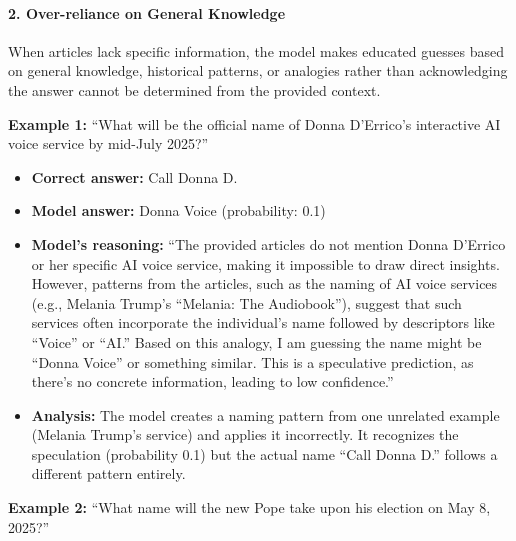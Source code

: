 \paragraph{2. Over-reliance on General Knowledge}

When articles lack specific information, the model makes educated guesses based on general knowledge, historical patterns, or analogies rather than acknowledging the answer cannot be determined from the provided context.

\textbf{Example 1:} ``What will be the official name of Donna D'Errico's interactive AI voice service by mid-July 2025?''

\begin{itemize}
\item \textbf{Correct answer:} Call Donna D.
\item \textbf{Model answer:} Donna Voice (probability: 0.1)
\item \textbf{Model's reasoning:} ``The provided articles do not mention Donna D'Errico or her specific AI voice service, making it impossible to draw direct insights. However, patterns from the articles, such as the naming of AI voice services (e.g., Melania Trump's ``Melania: The Audiobook''), suggest that such services often incorporate the individual's name followed by descriptors like ``Voice'' or ``AI.'' Based on this analogy, I am guessing the name might be ``Donna Voice'' or something similar. This is a speculative prediction, as there's no concrete information, leading to low confidence.''
\item \textbf{Analysis:} The model creates a naming pattern from one unrelated example (Melania Trump's service) and applies it incorrectly. It recognizes the speculation (probability 0.1) but the actual name ``Call Donna D.'' follows a different pattern entirely.
\end{itemize}

\textbf{Example 2:} ``What name will the new Pope take upon his election on May 8, 2025?''

